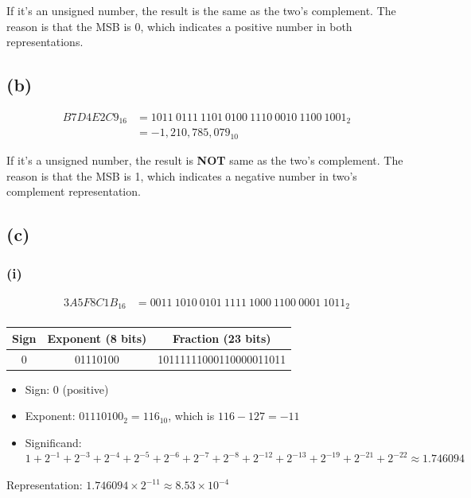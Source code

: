 \documentclass[12pt]{article}
\begin{document}
If it's an unsigned number, the result is the same as the two's complement. The reason is that the MSB is 0, which indicates a positive number in both representations.

\subsection*{(b)}

\begin{align*}
B7D4E2C9_{16} &= 1011\ 0111\ 1101\ 0100\ 1110\ 0010\ 1100\ 1001_{2} \\
&= -1,210,785,079_{10}
\end{align*}

If it's a unsigned number, the result is \textbf{NOT} same as the two's complement. The reason is that the MSB is 1, which indicates a negative number in two's complement representation.

\subsection*{(c)}

\subsubsection*{(i)}

\begin{align*}
3A5F8C1B_{16} &= 0011\ 1010\ 0101\ 1111\ 1000\ 1100\ 0001\ 1011_{2} \\
\end{align*}

\begin{center}
    \begin{tabular}{|c|c|c|}
        \hline
        \textbf{Sign} & \textbf{Exponent (8 bits)} & \textbf{Fraction (23 bits)} \\
        \hline
        0 & 01110100 & 10111111000110000011011 \\
        \hline
    \end{tabular}
\end{center}

\begin{itemize}
    \item Sign: 0 (positive)
    \item Exponent: $01110100_2 = 116_{10}$, which is $116 - 127 = -11$
    \item Significand: $1 + 2^{-1} + 2^{-3} + 2^{-4} + 2^{-5} + 2^{-6} + 2^{-7} + 2^{-8} + 2^{-12} + 2^{-13} + 2^{-19} + 2^{-21} + 2^{-22} \approx 1.746094$
\end{itemize}
Representation: $1.746094 \times 2^{-11} \approx 8.53 \times 10^{-4}$
\end{document}
